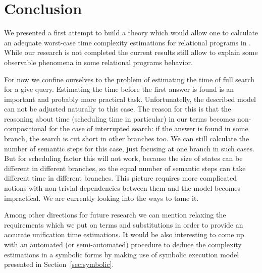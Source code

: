 \section{Conclusion}

We presented a first attempt to build a theory which would allow one to calculate an adequate worst-case time
complexity estimations for relational programs in \mK. While our research is not completed the current results still
allow to explain some observable phenomena in some relational programs behavior.

For now we confine ourselves to the problem of estimating the time of full search for a give query. Estimating the time before the first answer is found is an important and probably more practical task. Unfortunatelly, the described model can not be adjusted naturally to this case. The reason for this is that the reasoning about time (scheduling time in particular) in our terms becomes non-compositional for the case of interrupted search: if the answer is found in some branch, the search is cut short in other branches too. We can still calculate the number of semantic steps for this case, just focusing at one branch in such cases. But for scheduling factor this will not work, because the size of states can be different in different branches, so the equal number of semantic steps can take different time in different branches. This picture requires more complicated notions with non-trivial dependencies between them and the model becomes impractical. We are currently looking into the ways to tame it.

Among other directions for future research we can mention relaxing the requirements which we put on
terms and substitutions in order to provide an accurate unification time estimations. It would be also
interesting to come up with an automated (or semi-automated) procedure to deduce the complexity
estimations in a symbolic forms by making use of symbolic execution model presented in Section~\ref{sec:symbolic}.
